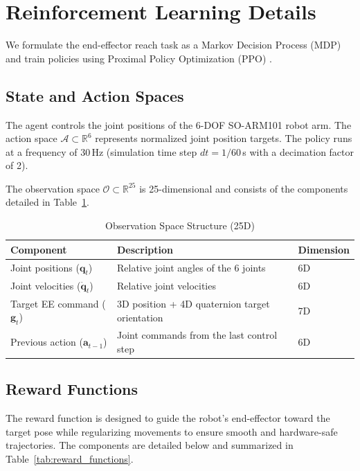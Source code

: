 
\section{Reinforcement Learning Details}
\label{sec:rl_details}

We formulate the end-effector reach task as a Markov Decision Process (MDP) and train policies using Proximal Policy Optimization (PPO) \cite{schulman2017proximal}. 

\subsection{State and Action Spaces}
The agent controls the joint positions of the 6-DOF SO-ARM101 robot arm. The action space $\mathcal{A} \subset \mathbb{R}^6$ represents normalized joint position targets. The policy runs at a frequency of 30\,Hz (simulation time step $dt = 1/60$\,s with a decimation factor of 2).

The observation space $\mathcal{O} \subset \mathbb{R}^{25}$ is 25-dimensional and consists of the components detailed in Table~\ref{tab:observation_space}.

\begin{table}[htbp]
  \centering
  \caption{Observation Space Structure (25D)}
  \label{tab:observation_space}
  \begin{tabular}{lll}
    \toprule
    Component & Description & Dimension \\
    \midrule
    Joint positions ($\boldsymbol{q}_t$) & Relative joint angles of the 6 joints & 6D \\
    Joint velocities ($\dot{\boldsymbol{q}}_t$) & Relative joint velocities & 6D \\
    Target EE command ($\boldsymbol{g}_t$) & 3D position + 4D quaternion target orientation & 7D \\
    Previous action ($\boldsymbol{a}_{t-1}$) & Joint commands from the last control step & 6D \\
    \bottomrule
  \end{tabular}
\end{table}

\subsection{Reward Functions}
The reward function is designed to guide the robot's end-effector toward the target pose while regularizing movements to ensure smooth and hardware-safe trajectories. The components are detailed below and summarized in Table~\ref{tab:reward_functions}.

